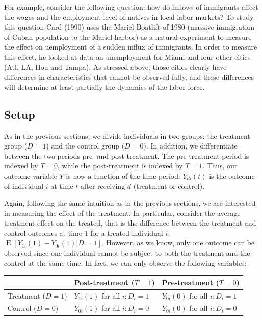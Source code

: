 \documentclass[12pt]{report}
\newcommand{\E}[1]{\operatorname{E}\left[#1\right]}
\begin{document}
For example, consider the following question: how do inflows of immigrants affect the wages and the employment level of natives in local labor markets? To study this question Card (1990) uses the Mariel Boatlift  of 1980 (massive immigration of Cuban population to the Mariel harbor) as a natural experiment to measure the effect on uemployment of a sudden influx of immigrants. In order to measure this effect, he looked at data on unemployment for Miami and four other cities (Atl, LA, Hou and Tampa). As stressed above, those cities clearly have differences in characteristics that cannot be observed fully, and these differences will determine at least partially the dynamics of the labor force.

\subsection{Setup}

As in the previous sections, we divide individuals in two groups: the treatment group ($D=1$) and the control group ($D=0$). In addition, we differentiate between the two periods pre- and post-treatment. The pre-treatment period is indexed by $T=0$, while the post-treatment is indexed by $T=1$. Thus, our outcome variable $Y$ is now a function of the time period: $Y_{di}(t)$ is the outcome of individual $i$ at time $t$ after receiving $d$ (treatment or control).

Again, following the same intuition as in the previous sections, we are interested in measuring the effect of the treatment. In particular, consider the average treatment effect on the treated, that is the difference between the treatment and control outcomes at time $1$ for a treated individual $i$: $\E{Y_{1i}(1) - Y_{0t}(1)\vert D=1}$. However, as we know, only one outcome can be observed since one individual cannot be subject to both the treatment and the control at the same time. In fact, we can only observe the following variables:

\begin{tabular}{l|l|l|}
\cline{2-3}
 & Post-treatment ($T=1$) & Pre-treatment ($T=0$) \\ \hline
\multicolumn{1}{|l|}{Treatment ($D=1$)} & $Y_{1i}(1)$ for all $i : D_i = 1$ & $Y_{0i}(0)$ for all $i : D_i = 1$ \\ \hline
\multicolumn{1}{|l|}{Control ($D=0$)} & $Y_{0i}(1)$ for all $i : D_i = 0$ & $Y_{0i}(0)$ for all $i : D_i = 0$ \\ \hline
\end{tabular}
\end{document}

